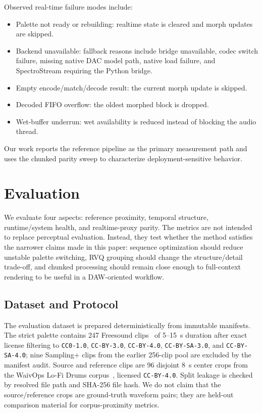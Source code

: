 \documentclass[twoside,a4paper]{article}
\begin{document}
Observed real-time failure modes include:
\begin{itemize}
    \item Palette not ready or rebuilding: realtime state is cleared and morph updates are skipped.
    \item Backend unavailable: fallback reasons include bridge unavailable, codec switch failure, missing native DAC model path, native load failure, and SpectroStream requiring the Python bridge.
    \item Empty encode/match/decode result: the current morph update is skipped.
    \item Decoded FIFO overflow: the oldest morphed block is dropped.
    \item Wet-buffer underrun: wet availability is reduced instead of blocking the audio thread.
\end{itemize}

Our work reports the reference pipeline as the primary measurement path and uses the chunked parity sweep to characterize deployment-sensitive behavior.

\section{Evaluation}\label{sec:evaluation}

We evaluate four aspects: reference proximity, temporal structure, runtime/system health, and realtime-proxy parity. The metrics are not intended to replace perceptual evaluation. Instead, they test whether the method satisfies the narrower claims made in this paper: sequence optimization should reduce unstable palette switching, RVQ grouping should change the structure/detail trade-off, and chunked processing should remain close enough to full-context rendering to be useful in a DAW-oriented workflow.

\subsection{Dataset and Protocol}

The evaluation dataset is prepared deterministically from immutable manifests. The strict palette contains 247 Freesound clips~\cite{fonseca2017freesound} of 5--15~s duration after exact license filtering to \texttt{CC0-1.0}, \texttt{CC-BY-3.0}, \texttt{CC-BY-4.0}, \texttt{CC-BY-SA-3.0}, and \texttt{CC-BY-SA-4.0}; nine Sampling+ clips from the earlier 256-clip pool are excluded by the manifest audit. Source and reference clips are 96 disjoint 8~s center crops from the WaivOps Lo-Fi Drums corpus~\cite{patchbanks_waivops_2025_lofi_drums}, licensed \texttt{CC-BY-4.0}. Split leakage is checked by resolved file path and SHA-256 file hash. We do not claim that the source/reference crops are ground-truth waveform pairs; they are held-out comparison material for corpus-proximity metrics.
\end{document}
